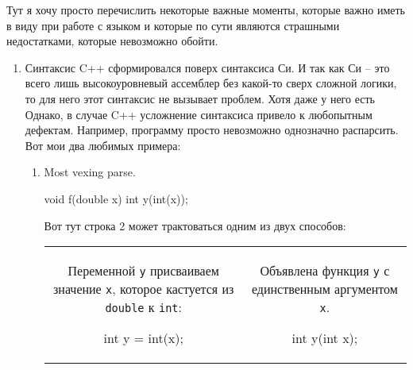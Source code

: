 Тут я хочу просто перечислить некоторые важные моменты, которые важно иметь в виду при работе с языком и которые по сути являются страшными недостатками, которые невозможно обойти.
\begin{enumerate}
\item %
Синтаксис C++ сформировался поверх синтаксиса Си.
И так как Си -- это всего лишь высокоуровневый ассемблер без какой-то сверх сложной логики, то для него этот синтаксис не вызывает проблем.
Хотя даже у него есть Однако, в случае C++ усложнение синтаксиса привело к любопытным дефектам.
Например, программу просто невозможно однозначно распарсить.
Вот мои два любимых примера:
\begin{enumerate}
\item Most vexing parse.

\begin{cppcode}
void f(double x) {
  int y(int(x));
}
\end{cppcode}
Вот тут строка 2 может трактоваться одним из двух способов:
\begin{center}
\begin{tabular}{cc}
{
\begin{minipage}{7cm}
Переменной \verb"y" присваиваем значение \verb"x", которое кастуется из \verb"double" к \verb"int":
\begin{cppcode}[numbers=none]
int y = int(x);
\end{cppcode}
\end{minipage}
}&{
\begin{minipage}{7cm}
Объявлена функция \verb"y" с единственным аргументом \verb"x".
\begin{cppcode}[numbers=none]
int y(int x);
\end{cppcode}
\end{minipage}
}\\
\end{tabular}
\end{center}


\end{enumerate}
\end{enumerate}
